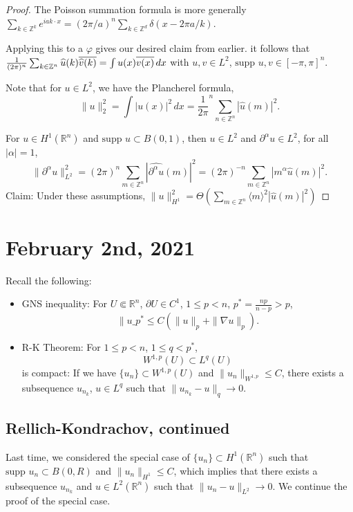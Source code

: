 \documentclass[12pt]{scrartcl}
\newcommand{\Z}{\mathbb{Z}}
\newcommand{\R}{\mathbb{R}}
\renewcommand{\hat}{\widehat}
\newcommand{\<}{\langle}
\renewcommand{\>}{\rangle}
\let \phi \varphi
\newcommand{\supp}{\text{supp }}
\let \grad \nabla
\begin{document}
\begin{proof}
The Poisson summation formula is more generally $\sum_{k \in \Z^k} e^{iak \cdot x} = (2\pi/a)^n \sum_{k \in \Z^d} \delta(x - 2\pi a/k)$.

Applying this to a $\phi$ gives our desired claim from earlier.  it follows that $\frac{1}{(2\pi)^n} \sum_{k \in \Z^n} \hat{u}(k)\ol{\hat{v}(k)} = \int u(x) \ol{v(x)}\,dx$ with $u, v \in L^2$, $\supp u, v \in [-\pi, \pi]^n$.

Note that for $u \in L^2$, we have the Plancherel formula,
$$\|u\|_2^2 = \int |u(x)|^2\,dx = \frac{1}{2\pi}^n \sum_{n \in \Z^n} |\hat{u}(m)|^2.$$

For $u \in H^1(\R^n)$ and $\supp u \subset B(0, 1)$, then $u \in L^2$ and $\partial^\alpha u \in L^2$, for all $|\alpha| = 1$, 
$$\|\partial^\alpha u\|_{L^2}^2 = (2\pi)^n \sum_{ m \in \Z^n} |\hat{\partial^\alpha u}(m)|^2 = (2\pi)^{-n} \sum_{m \in \Z^n} |m^\alpha\hat{u}(m)|^2.$$
Claim: Under these assumptions, $\|u\|_{H^1}^2 = \Theta( \sum_{m \in \Z^n} \<m\>^2 |\hat{u}(m)|^2)$
\end{proof}

\pagebreak
\section{February 2nd, 2021}
Recall the following:
\begin{itemize}
\item GNS inequality: For $U \Subset \R^n$, $\partial U \in C^1$, $1 \le p < n$, $p^* = \frac{np}{n-p} >p$,
$$\|u\_{p^*} \le C(\|u\|_p + \|\grad u\|_p).$$
\item R-K Theorem: For $1 \le p < n$, $1 \le q < p^*$, $$W^{1, p}(U) \subset L^q(U)$$
is compact: If we have $\{u_n\}\subset W^{1, p}(U)$ and $\|u_n\|_{W^{1, p}} \le C$, there exists a subsequence $u_{n_k}$, $u \in L^q$ such that $\|u_{n_k} - u\|_{q} \to 0$.
\end{itemize} 

\subsection{Rellich-Kondrachov, continued}
Last time, we considered the special case of $\{u_n\} \subset H^1(\R^n)$ such that $\supp u_n \subset B(0, R)$ and $\|u_n\|_{H^1} \le C$, which implies that there exists a subsequence $u_{n_k}$ and $u \in L^2(\R^n)$ such that $\|u_n-u\|_{L^2} \to 0$.  We continue the proof of the special case. 
\end{document}
